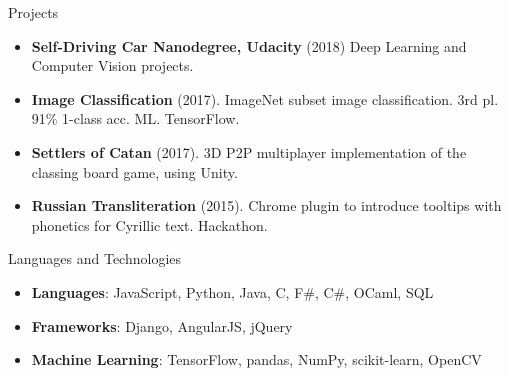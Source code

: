 \documentclass[]{muchicv}
\begin{document}
	\begin{cvsection}{Projects}
		\begin{cvsubsection}{}{}{}
			\begin{itemize}
				\item \textbf{Self-Driving Car Nanodegree, Udacity} (2018) Deep Learning and Computer Vision projects.
				\item \textbf{Image Classification} (2017). ImageNet subset image classification. 3rd pl. 91\% 1-class acc. ML. TensorFlow.
				\item \textbf{Settlers of Catan} (2017).  3D P2P multiplayer implementation of the classing board game, using Unity.
				\item \textbf{Russian Transliteration} (2015). Chrome plugin to introduce tooltips with phonetics for Cyrillic text. Hackathon.
			\end{itemize}
		\end{cvsubsection}
	\end{cvsection}
	
	\begin{cvsection}{Languages and Technologies}
		\begin{cvsubsection}{}{}{}	
			\begin{itemize}
				\item \textbf{Languages}: JavaScript, Python, Java, C, F\#, C\#, OCaml, SQL 
				\item \textbf{Frameworks}: Django, AngularJS, jQuery
				\item \textbf{Machine Learning}: TensorFlow, pandas, NumPy, scikit-learn, OpenCV
			\end{itemize}
		\end{cvsubsection}
	\end{cvsection}
	
\end{document}
